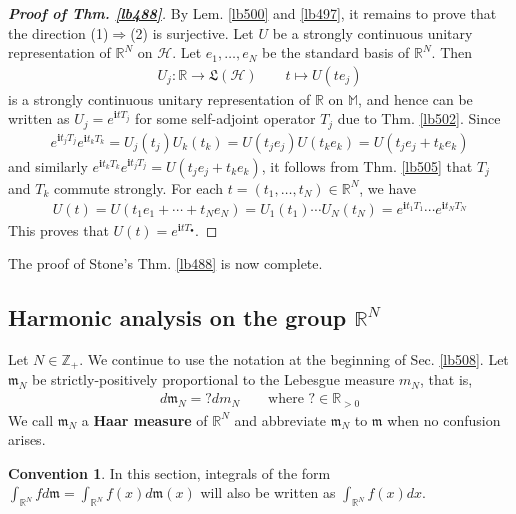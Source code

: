 \documentclass[12pt,b5paper,notitlepage]{article}
\theoremstyle{definition}
\newtheorem{cv}[df]{Convention}
\theoremstyle{plain}
\newcommand{\fk}{\mathfrak}
\newcommand{\im}{\mathbf{i}}
\newcommand{\blt}{\bullet}
\newcommand{\Mbb}{\mathbb M}
\newcommand{\Zbb}{\mathbb Z}
\newcommand{\Rbb}{\mathbb R}
\newcommand{\mk}{\mathfrak m}
\newcommand{\MH}{\mathcal H}
\numberwithin{equation}{section}
\begin{document}
\begin{proof}[\textbf{Proof of Thm. \ref{lb488}}]
By Lem. \ref{lb500} and \ref{lb497}, it remains to prove that the direction (1)$\Rightarrow$(2) is surjective. Let $U$ be a strongly continuous unitary representation of $\Rbb^N$ on $\MH$. Let $e_1,\dots,e_N$ be the standard basis of $\Rbb^N$. Then
\begin{align*}
U_j:\Rbb\rightarrow\fk L(\MH)\qquad t\mapsto U(te_j)
\end{align*}
is a strongly continuous unitary representation of $\Rbb$ on $\Mbb$, and hence can be written as $U_j=e^{\im tT_j}$ for some self-adjoint operator $T_j$ due to Thm. \ref{lb502}. Since
\begin{align*}
e^{\im t_jT_j}e^{\im t_kT_k}=U_j(t_j)U_k(t_k)=U(t_je_j)U(t_ke_k)=U(t_je_j+t_ke_k)
\end{align*}
and similarly $e^{\im t_kT_k}e^{\im t_jT_j}=U(t_je_j+t_ke_k)$, it follows from Thm. \ref{lb505} that $T_j$ and $T_k$ commute strongly. For each $t=(t_1,\dots,t_N)\in\Rbb^N$, we have
\begin{align*}
U(t)=U(t_1e_1+\cdots+t_Ne_N)=U_1(t_1)\cdots U_N(t_N)=e^{\im t_1T_1}\cdots e^{\im t_NT_N}
\end{align*}
This proves that $U(t)=e^{\im tT_\blt}$.
\end{proof}



The proof of Stone's Thm. \ref{lb488} is now complete.








\subsection{Harmonic analysis on the group $\Rbb^N$}\label{lb527}


Let $N\in\Zbb_+$. We continue to use the notation at the beginning of Sec. \ref{lb508}. Let $\mk_N$ be strictly-positively proportional to the Lebesgue measure $m_N$, that is,
\begin{align*}
d\mk_N=? dm_N\qquad\text{where }?\in\Rbb_{>0}
\end{align*}
We call $\mk_N$ a \textbf{Haar measure} of $\Rbb^N$ and abbreviate $\mk_N$ to $\mk$ when no confusion arises. 

\begin{cv}\label{lb545}
In this section, integrals of the form $\int_{\Rbb^N} fd\mk=\int_{\Rbb^N}f(x)d\mk(x)$ will also be written as $\int_{\Rbb^N}f(x)dx$.
\end{cv}
\end{document}
